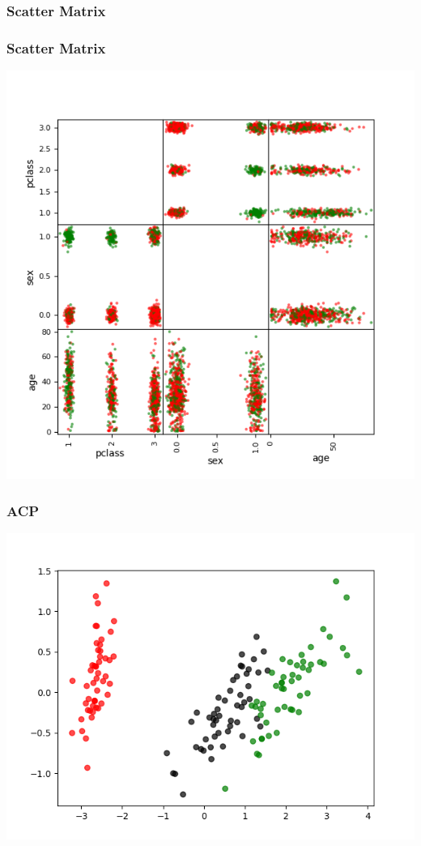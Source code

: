 \documentclass[11pt]{beamer}
\newenvironment{slide}[1]{%
\begin{frame}[environment=slide]
\frametitle{#1}
}{%
\end{frame}
}
\newcommand{\Python}[1]{
	{\small	}
}
\begin{document}
\begin{slide}{Scatter Matrix}
\begin{center}
\Python{scatter_matrix}
\end{center}
\end{slide}

\begin{slide}{Scatter Matrix}
\begin{center}
\includegraphics[scale=0.4]{titanic_matrix}
\end{center}
\end{slide}

\begin{slide}{ACP}
\begin{center}
\includegraphics[scale=0.4]{iris_acp}
\end{center}
\end{slide}
\end{document}
